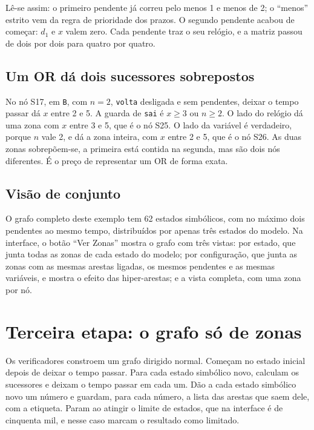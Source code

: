 \documentclass[11pt,a4paper]{article}
\newcommand{\code}[1]{\texttt{#1}}
\begin{document}
Lê-se assim: o primeiro pendente já correu pelo menos 1 e menos de 2; o ``menos'' estrito vem da regra de prioridade dos prazos. O segundo pendente acabou de começar: \(d_1\) e \(x\) valem zero. Cada pendente traz o seu relógio, e a matriz passou de dois por dois para quatro por quatro.

\subsection{Um OR dá dois sucessores sobrepostos}

No nó S17, em \code{B}, com \(n = 2\), \code{volta} desligada e sem pendentes, deixar o tempo passar dá \(x\) entre 2 e 5. A guarda de \code{sai} é \(x \geq 3\) ou \(n \geq 2\). O lado do relógio dá uma zona com \(x\) entre 3 e 5, que é o nó S25. O lado da variável é verdadeiro, porque \(n\) vale 2, e dá a zona inteira, com \(x\) entre 2 e 5, que é o nó S26. As duas zonas sobrepõem-se, a primeira está contida na segunda, mas são dois nós diferentes. É o preço de representar um OR de forma exata.

\subsection{Visão de conjunto}

O grafo completo deste exemplo tem 62 estados simbólicos, com no máximo dois pendentes ao mesmo tempo, distribuídos por apenas três estados do modelo. Na interface, o botão ``Ver Zonas'' mostra o grafo com três vistas: por estado, que junta todas as zonas de cada estado do modelo; por configuração, que junta as zonas com as mesmas arestas ligadas, os mesmos pendentes e as mesmas variáveis, e mostra o efeito das hiper-arestas; e a vista completa, com uma zona por nó.

\section{Terceira etapa: o grafo só de zonas}

Os verificadores constroem um grafo dirigido normal. Começam no estado inicial depois de deixar o tempo passar. Para cada estado simbólico novo, calculam os sucessores e deixam o tempo passar em cada um. Dão a cada estado simbólico novo um número e guardam, para cada número, a lista das arestas que saem dele, com a etiqueta. Param ao atingir o limite de estados, que na interface é de cinquenta mil, e nesse caso marcam o resultado como limitado.
\end{document}
